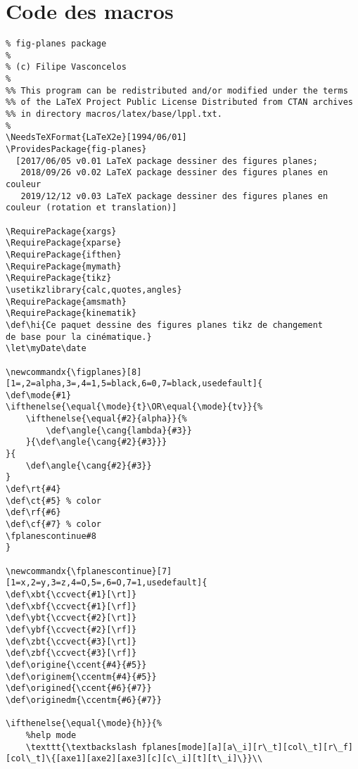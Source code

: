 \documentclass[a4paper,9pt]{article}
\begin{document}
\section{Code des macros}
\footnotesize
\begin{verbatim}
% fig-planes package
% 
% (c) Filipe Vasconcelos
%
%% This program can be redistributed and/or modified under the terms
%% of the LaTeX Project Public License Distributed from CTAN archives
%% in directory macros/latex/base/lppl.txt.
% 
\NeedsTeXFormat{LaTeX2e}[1994/06/01]
\ProvidesPackage{fig-planes}
  [2017/06/05 v0.01 LaTeX package dessiner des figures planes;
   2018/09/26 v0.02 LaTeX package dessiner des figures planes en couleur
   2019/12/12 v0.03 LaTeX package dessiner des figures planes en couleur (rotation et translation)]

\RequirePackage{xargs}
\RequirePackage{xparse}
\RequirePackage{ifthen}
\RequirePackage{mymath}
\RequirePackage{tikz}
\usetikzlibrary{calc,quotes,angles}
\RequirePackage{amsmath}
\RequirePackage{kinematik}
\def\hi{Ce paquet dessine des figures planes tikz de changement 
de base pour la cinématique.}
\let\myDate\date

\newcommandx{\figplanes}[8][1=,2=alpha,3=,4=1,5=black,6=0,7=black,usedefault]{ 
\def\mode{#1}
\ifthenelse{\equal{\mode}{t}\OR\equal{\mode}{tv}}{%
    \ifthenelse{\equal{#2}{alpha}}{%
        \def\angle{\cang{lambda}{#3}}
    }{\def\angle{\cang{#2}{#3}}}
}{
    \def\angle{\cang{#2}{#3}}
}
\def\rt{#4}
\def\ct{#5} % color
\def\rf{#6}
\def\cf{#7} % color
\fplanescontinue#8
}

\newcommandx{\fplanescontinue}[7][1=x,2=y,3=z,4=O,5=,6=O,7=1,usedefault]{ 
\def\xbt{\ccvect{#1}[\rt]}
\def\xbf{\ccvect{#1}[\rf]}
\def\ybt{\ccvect{#2}[\rt]}
\def\ybf{\ccvect{#2}[\rf]}
\def\zbt{\ccvect{#3}[\rt]}
\def\zbf{\ccvect{#3}[\rf]}
\def\origine{\ccent{#4}{#5}}
\def\originem{\ccentm{#4}{#5}}
\def\origined{\ccent{#6}{#7}}
\def\originedm{\ccentm{#6}{#7}}

\ifthenelse{\equal{\mode}{h}}{%
    %help mode
    \texttt{\textbackslash fplanes[mode][a][a\_i][r\_t][col\_t][r\_f][col\_t]\{[axe1][axe2][axe3][c][c\_i][t][t\_i]\}}\\


\end{verbatim}
\end{document}
